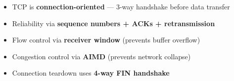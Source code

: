 \documentclass[main.tex]{subfiles}
\begin{document}
\begin{summarybox}
\begin{itemize}
    \item TCP is \textbf{connection-oriented} — 3-way handshake before data transfer
    \item Reliability via \textbf{sequence numbers + ACKs + retransmission}
    \item Flow control via \textbf{receiver window} (prevents buffer overflow)
    \item Congestion control via \textbf{AIMD} (prevents network collapse)
    \item Connection teardown uses \textbf{4-way FIN handshake}
\end{itemize}
\end{summarybox}
\end{document}
